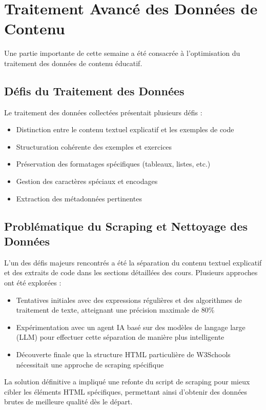 \section{Traitement Avancé des Données de Contenu}

Une partie importante de cette semaine a été consacrée à l'optimisation du traitement des données de contenu éducatif.

\subsection{Défis du Traitement des Données}

Le traitement des données collectées présentait plusieurs défis :
\begin{itemize}
  \item Distinction entre le contenu textuel explicatif et les exemples de code
  \item Structuration cohérente des exemples et exercices
  \item Préservation des formatages spécifiques (tableaux, listes, etc.)
  \item Gestion des caractères spéciaux et encodages
  \item Extraction des métadonnées pertinentes
\end{itemize}

\subsection{Problématique du Scraping et Nettoyage des Données}

L'un des défis majeurs rencontrés a été la séparation du contenu textuel explicatif et des extraits de code dans les sections détaillées des cours. Plusieurs approches ont été explorées :

\begin{itemize}
  \item Tentatives initiales avec des expressions régulières et des algorithmes de traitement de texte, atteignant une précision maximale de 80\%
  \item Expérimentation avec un agent IA basé sur des modèles de langage large (LLM) pour effectuer cette séparation de manière plus intelligente
  \item Découverte finale que la structure HTML particulière de W3Schools nécessitait une approche de scraping spécifique
\end{itemize}

La solution définitive a impliqué une refonte du script de scraping pour mieux cibler les éléments HTML spécifiques, permettant ainsi d'obtenir des données brutes de meilleure qualité dès le départ.

